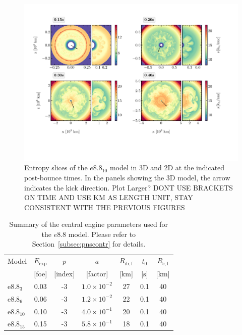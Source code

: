 \documentclass[fleqn,usenatbib]{mnras}
\newcommand{\km}{\ensuremath{\mathrm{km}}\xspace}
\renewcommand{\sec}{\xspace\ensuremath{\text{s}}}
\newcommand{\NY}[2]{{\color{blue}\sout{#1}#2}}
\newcommand{\COM}[1]{{\color{orange}#1}}
\begin{document}
\begin{figure}
 \includegraphics[width=\textwidth,trim=0.5cm 2.0cm 1cm 1cm,clip]{pic/e8_10_2d3d_sto_cuts_4times_TNSE_paper.pdf}
 \caption{Entropy slices of the $e8.8_{10}$ model in 3D and 2D at the indicated post-bounce times. In the panels showing the 3D model, the arrow indicates the kick direction. \COM{Plot Larger?} \NY{}{DONT USE BRACKETS ON TIME AND USE KM AS LENGTH UNIT, STAY CONSISTENT WITH THE PREVIOUS FIGURES} \smiley{}}
 \label{fig:e8 sto 4 times}
\end{figure}


\begin{table}
\centering
   \begin{tabular}{l| c | c | c | c | c | c}
  \label{table:e8param}
  Model &$E_{\mathrm{exp}}$& $p$ & $a$ & $R_{\mathrm{ib,f}}$ & $t_0$ & $R_{\mathrm{c,f}}$\\
                & [foe] & [index]  & [factor]  & [$\km$]  & [$\sec$]& [$\km$] \\
  \hline \hline
  $\mathrm{e}8.8_{3}$  &  0.03 &    -3 & $1.0\times 10^{-2}$ &27 & 0.1 & 40 \\
  $\mathrm{e}8.8_{6}$  &  0.06 &   -3 & $1.2\times 10^{-2}$ &22 & 0.1 & 40 \\
  $\mathrm{e}8.8_{10}$ & 0.10 &   -3 & $4.0\times 10^{-1}$ & 20 & 0.1 & 40 \\
  $\mathrm{e}8.8_{15}$ & 0.15 &   -3 & $5.8\times 10^{-1}$ & 18 & 0.1 & 40 \\
  \end{tabular}
\caption{Summary of the central engine parameters used for the $e8.8$ model. Please refer to Section~\ref{subsec:pnscontr} for details.}
\end{table}
\end{document}
